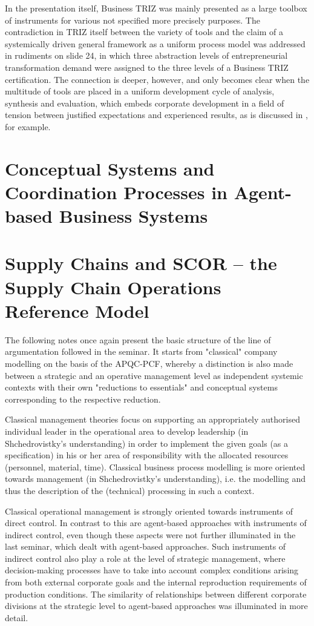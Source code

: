\documentclass[11pt,a4paper]{article}
\begin{document}
In the presentation itself, Business TRIZ was mainly presented as a large
toolbox of instruments for various not specified more precisely purposes. The
contradiction in TRIZ itself between the variety of tools and the claim of a
systemically driven general framework as a uniform process model was addressed
in rudiments on slide 24, in which three abstraction levels of entrepreneurial
transformation demand were assigned to the three levels of a Business TRIZ
certification. The connection is deeper, however, and only becomes clear when
the multitude of tools are placed in a uniform development cycle of analysis,
synthesis and evaluation, which embeds corporate development in a field of
tension between justified expectations and experienced results, as is
discussed in \cite{Ackoff1997}, for example.

\section{Conceptual Systems and Coordination Processes in Agent-based
  Business Systems}

\section{Supply Chains and SCOR -- the Supply Chain Operations Reference
  Model}

The following notes once again present the basic structure of the line of
argumentation followed in the seminar. It starts from "classical" company
modelling on the basis of the APQC-PCF, whereby a distinction is also made
between a strategic and an operative management level as independent systemic
contexts with their own "reductions to essentials" and conceptual systems
corresponding to the respective reduction.

Classical management theories focus on supporting an appropriately authorised
individual leader in the operational area to develop leadership (in
Shchedrovistky's understanding) in order to implement the given goals (as a
specification) in his or her area of responsibility with the allocated
resources (personnel, material, time). Classical business process modelling is
more oriented towards management (in Shchedrovistky's understanding), i.e. the
modelling and thus the description of the (technical) processing in such a
context.

Classical operational management is strongly oriented towards instruments of
direct control. In contrast to this are agent-based approaches with
instruments of indirect control, even though these aspects were not further
illuminated in the last seminar, which dealt with agent-based approaches. Such
instruments of indirect control also play a role at the level of strategic
management, where decision-making processes have to take into account complex
conditions arising from both external corporate goals and the internal
reproduction requirements of production conditions. The similarity of
relationships between different corporate divisions at the strategic level to
agent-based approaches was illuminated in more detail.
\end{document}
